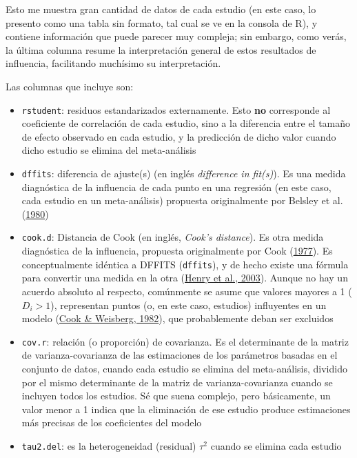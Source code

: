 \documentclass[
  bookmarksnumbered]{article}
\begin{document}
Esto me muestra gran cantidad de datos de cada estudio (en este caso, lo presento como una tabla sin formato, tal cual se ve en la consola de R), y contiene información que puede parecer muy compleja; sin embargo, como verás, la última columna resume la interpretación general de estos resultados de influencia, facilitando muchísimo su interpretación.

Las columnas que incluye son:

\begin{itemize}
\item
  \texttt{rstudent}: residuos estandarizados externamente. Esto \textbf{no} corresponde al coeficiente de correlación de cada estudio, sino a la diferencia entre el tamaño de efecto observado en cada estudio, y la predicción de dicho valor cuando dicho estudio se elimina del meta-análisis
\item
  \texttt{dffits}: diferencia de ajuste(s) (en inglés \emph{difference in fit(s)}). Es una medida diagnóstica de la influencia de cada punto en una regresión (en este caso, cada estudio en un meta-análisis) propuesta originalmente por Belsley et al. (\protect\hyperlink{ref-belsleyRegressionDiagnosticsIdentifying1980}{1980})
\item
  \texttt{cook.d}: Distancia de Cook (en inglés, \emph{Cook's distance}). Es otra medida diagnóstica de la influencia, propuesta originalmente por Cook (\protect\hyperlink{ref-cookDetectionInfluentialObservation1977}{1977}). Es conceptualmente idéntica a DFFITS (\texttt{dffits}), y de hecho existe una fórmula para convertir una medida en la otra (\protect\hyperlink{ref-Henry2003}{Henry et al., 2003}). Aunque no hay un acuerdo absoluto al respecto, comúnmente se asume que valores mayores a 1 (\(D_{i} > 1\)), representan puntos (o, en este caso, estudios) influyentes en un modelo (\protect\hyperlink{ref-cookResidualsInfluenceRegression1982}{Cook \& Weisberg, 1982}), que probablemente deban ser excluidos
\item
  \texttt{cov.r}: relación (o proporción) de covarianza. Es el determinante de la matriz de varianza-covarianza de las estimaciones de los parámetros basadas en el conjunto de datos, cuando cada estudio se elimina del meta-análisis, dividido por el mismo determinante de la matriz de varianza-covarianza cuando se incluyen todos los estudios. Sé que suena complejo, pero básicamente, un valor menor a 1 indica que la eliminación de ese estudio produce estimaciones más precisas de los coeficientes del modelo
\item
  \texttt{tau2.del}: es la heterogeneidad (residual) \(\tau^2\) cuando se elimina cada estudio

\end{itemize}
\end{document}
